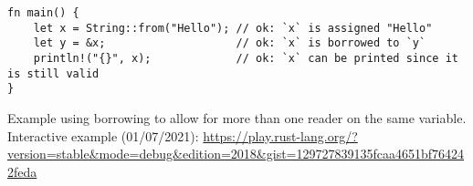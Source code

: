 \begin{listing}
    \begin{verbatim}
fn main() {
    let x = String::from("Hello"); // ok: `x` is assigned "Hello"
    let y = &x;                    // ok: `x` is borrowed to `y`
    println!("{}", x);             // ok: `x` can be printed since it is still valid
}
    \end{verbatim}
    \caption{Example using borrowing to allow for more than one reader on the same variable. Interactive example (01/07/2021): \url{https://play.rust-lang.org/?version=stable&mode=debug&edition=2018&gist=129727839135fcaa4651bf764242feda}}
    \label{lst:rust-borrow}
\end{listing}